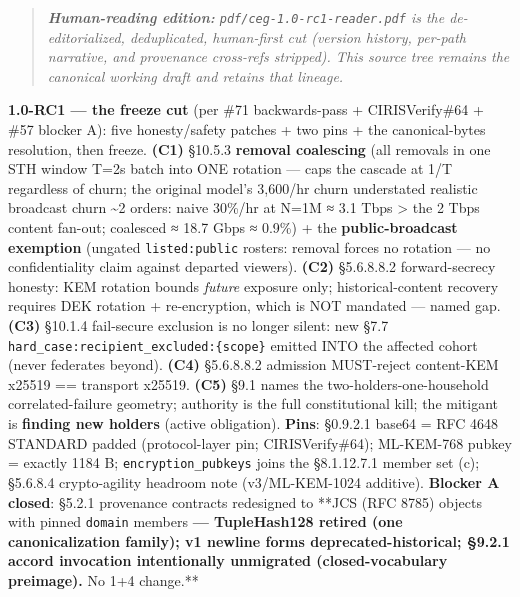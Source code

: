 \documentclass[10pt]{article}
\begin{document}
\begin{quote}\itshape \textbf{Human-reading edition:} \texttt{pdf/ceg-1.0-rc1-reader.pdf} is the de-editorialized, deduplicated, human-first cut (version history, per-path narrative, and provenance cross-refs stripped). This source tree remains the canonical working draft and retains that lineage.\end{quote}


\textbf{1.0-RC1 — the freeze cut} (per \#71 backwards-pass + CIRISVerify\#64 + \#57 blocker A): five honesty/safety patches + two pins + the canonical-bytes resolution, then freeze. \textbf{(C1)} §10.5.3 \textbf{removal coalescing} (all removals in one STH window T=2s batch into ONE rotation — caps the cascade at 1/T regardless of churn; the original model's 3,600/hr churn understated realistic broadcast churn \textasciitilde{}2 orders: naive 30\%/hr at N=1M ≈ 3.1 Tbps > the 2 Tbps content fan-out; coalesced ≈ 18.7 Gbps ≈ 0.9\%) + the \textbf{public-broadcast exemption} (ungated \texttt{listed:public} rosters: removal forces no rotation — no confidentiality claim against departed viewers). \textbf{(C2)} §5.6.8.8.2 forward-secrecy honesty: KEM rotation bounds \textit{future} exposure only; historical-content recovery requires DEK rotation + re-encryption, which is NOT mandated — named gap. \textbf{(C3)} §10.1.4 fail-secure exclusion is no longer silent: new §7.7 \texttt{hard\_case:recipient\_excluded:\{scope\}} emitted INTO the affected cohort (never federates beyond). \textbf{(C4)} §5.6.8.8.2 admission MUST-reject content-KEM x25519 == transport x25519. \textbf{(C5)} §9.1 names the two-holders-one-household correlated-failure geometry; authority is the full constitutional kill; the mitigant is \textbf{finding new holders} (active obligation). \textbf{Pins}: §0.9.2.1 base64 = RFC 4648 STANDARD padded (protocol-layer pin; CIRISVerify\#64); ML-KEM-768 pubkey = exactly 1184 B; \texttt{encryption\_pubkeys} joins the §8.1.12.7.1 member set (c); §5.6.8.4 crypto-agility headroom note (v3/ML-KEM-1024 additive). \textbf{Blocker A closed}: §5.2.1 provenance contracts redesigned to **JCS (RFC 8785) objects with pinned \texttt{domain} members\textbf{ — TupleHash128 retired (one canonicalization family); v1 newline forms deprecated-historical; §9.2.1 accord invocation intentionally unmigrated (closed-vocabulary preimage). }No 1+4 change.**
\end{document}
